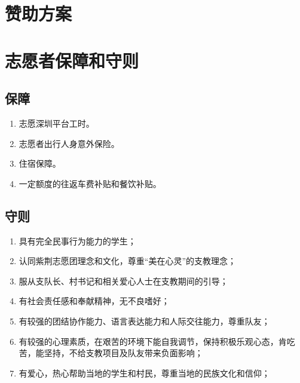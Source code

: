 \documentclass[12pt]{ctexart}
\begin{document}
\begin{appendix}
\section{赞助方案}

\section{志愿者保障和守则}
\subsection{保障}
\begin{enumerate}
\item 志愿深圳平台工时。
\item 志愿者出行人身意外保险。
\item 住宿保障。
\item 一定额度的往返车费补贴和餐饮补贴。
\end{enumerate}
\subsection{守则}
\begin{enumerate}[label = {(\chinese*)}]
\item 具有完全民事行为能力的学生；
\item 认同紫荆志愿团理念和文化，尊重“美在心灵”的支教理念；
\item 服从支队长、村书记和相关爱心人士在支教期间的引导；
\item 有社会责任感和奉献精神，无不良嗜好；
\item 有较强的团结协作能力、语言表达能力和人际交往能力，尊重队友；
\item 有较强的心理素质，在艰苦的环境下能自我调节，保持积极乐观心态，肯吃苦，能坚持，不给支教项目及队友带来负面影响； 
\item 有爱心，热心帮助当地的学生和村民，尊重当地的民族文化和信仰；
\end{enumerate}
\end{appendix}
\end{document}
